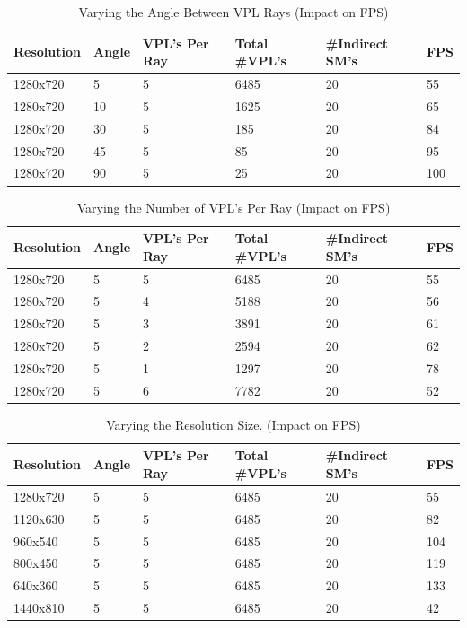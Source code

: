 \begin{table}[h!]
	\caption{Varying the Angle Between VPL Rays (Impact on FPS)}
	\begin{center}
	    \begin{tabular}{ | l | l | l | l | l | l |}
	    \hline
	    Resolution & Angle & VPL's Per Ray & Total \#VPL's & \#Indirect SM's & FPS\\ \hline
	    1280x720 & 5 & 5 & 6485 & 20 & 55\\ \hline
	    1280x720 & 10 & 5 & 1625 & 20 & 65\\ \hline
	    1280x720 & 30 & 5 & 185 & 20 & 84\\ \hline
	    1280x720 & 45 & 5 & 85 & 20 & 95\\ \hline
	    1280x720 & 90 & 5 & 25 & 20 & 100\\ \hline
	    \end{tabular}
	\end{center}
	\label{table:5.1}
\end{table}

\begin{table}[h!]
	\caption{Varying the Number of VPL's Per Ray (Impact on FPS)}
	\begin{center}
	    \begin{tabular}{ | l | l | l | l | l | l |}
	    \hline
	    Resolution & Angle & VPL's Per Ray & Total \#VPL's & \#Indirect SM's & FPS\\ \hline
	    1280x720 & 5 & 5 & 6485 & 20 & 55\\ \hline
	    1280x720 & 5 & 4 & 5188 & 20 & 56\\ \hline
	    1280x720 & 5 & 3 & 3891 & 20 & 61\\ \hline
	    1280x720 & 5 & 2 & 2594 & 20 & 62\\ \hline
	    1280x720 & 5 & 1 & 1297 & 20 & 78\\ \hline
	    1280x720 & 5 & 6 & 7782 & 20 & 52\\ \hline
	    \end{tabular}
	\end{center}
	\label{table:5.2}
\end{table}

\begin{table}[h!]
	\caption{Varying the Resolution Size. (Impact on FPS)}
	\begin{center}
	    \begin{tabular}{ | l | l | l | l | l | l |}
	    \hline
	    Resolution & Angle & VPL's Per Ray & Total \#VPL's & \#Indirect SM's & FPS\\ \hline
	    1280x720 & 5 & 5 & 6485 & 20 & 55\\ \hline
	    1120x630 & 5 & 5 & 6485 & 20 & 82\\ \hline
	    960x540 & 5 & 5 & 6485 & 20 & 104\\ \hline
	    800x450 & 5 & 5 & 6485 & 20 & 119\\ \hline
	    640x360 & 5 & 5 & 6485 & 20 & 133\\ \hline
	    1440x810 & 5 & 5 & 6485 & 20 & 42\\ \hline
	    \end{tabular}
	\end{center}
	\label{table:5.3}
\end{table}

